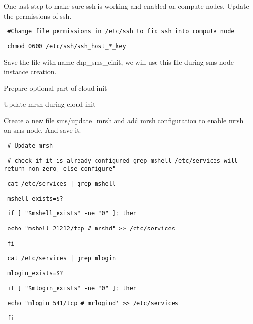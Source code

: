 \documentclass[12pt]{article}
\begin{document}
One last step to make sure ssh is working and enabled on compute nodes. Update the permissions of ssh.

\begin{bash}\texttt{\small{ \#Change file permissions in /etc/ssh to fix ssh into compute node}}\end{bash}
\begin{bash}\texttt{\small{ chmod 0600 /etc/ssh/ssh\_host\_*\_key}}\end{bash}

Save the file with name chp\_sms\_cinit, we will use this file during sms node instance creation.

Prepare optional part of cloud-init

Update mrsh during cloud-init 

Create a new file sms/update\_mrsh and add mrsh configuration to enable mrsh on sms node. And save it. 


\begin{bash}\texttt{\small{ \# Update mrsh}}\end{bash}
\begin{bash}\texttt{\small{ \# check if it is already configured grep mshell /etc/services will return non-zero, else configure"}}\end{bash}
\begin{bash}\texttt{\small{ cat /etc/services | grep mshell}}\end{bash}
\begin{bash}\texttt{\small{ mshell\_exists=\$?}}\end{bash}
\begin{bash}\texttt{\small{ if [ "\${mshell\_exists}" -ne "0" ]; then}}\end{bash}
\begin{bash}\texttt{\small{     echo "mshell          21212/tcp                  \# mrshd" >> /etc/services}}\end{bash}
\begin{bash}\texttt{\small{ fi}}\end{bash}
\begin{bash}\texttt{\small{ cat /etc/services | grep mlogin}}\end{bash}
\begin{bash}\texttt{\small{ mlogin\_exists=\$?}}\end{bash}
\begin{bash}\texttt{\small{ if [ "\${mlogin\_exists}" -ne "0" ]; then}}\end{bash}
\begin{bash}\texttt{\small{     echo "mlogin            541/tcp                  \# mrlogind" >> /etc/services}}\end{bash}
\begin{bash}\texttt{\small{ fi}}\end{bash}
\end{document}
